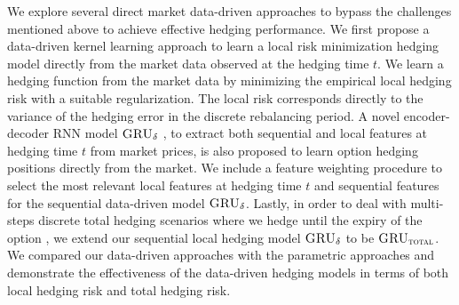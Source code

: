 \documentclass[letterpaper,12pt,titlepage,oneside,final]{book}
\numberwithin{equation}{section}
\theoremstyle{definition}
\newcommand{\model}{\textsc{GRU}_\delta}
\newcommand{\modelT}{\textsc{GRU}_{\textsc{total}}}
\begin{document}
We explore several direct market data-driven approaches to bypass  the challenges mentioned above to achieve effective hedging performance.
We first propose a  data-driven kernel learning approach \cite{knian2017} to learn a local risk minimization hedging model directly from the market data observed at the hedging time $t$.  We learn a  hedging function from the market data by minimizing  the  empirical local hedging  risk with a suitable regularization. The local risk corresponds directly to the variance of the hedging error in the discrete rebalancing period. A novel encoder-decoder  RNN model $\model$ \cite{knian2019}, to extract both sequential and local features at hedging time $t$ from market prices, is also proposed to learn option hedging positions directly from the market. We include a feature weighting procedure to select the most relevant local features at hedging time $t$ and sequential features for the sequential data-driven model $\model$. Lastly, in order to deal with multi-steps discrete total hedging scenarios where we hedge until the expiry of the option \cite{knian2020}, we extend our sequential local hedging model $\model$ to be $\modelT$. We compared our data-driven approaches with the parametric approaches and demonstrate the effectiveness of the data-driven hedging models in terms of both local hedging risk and total hedging risk.





\end{document}
